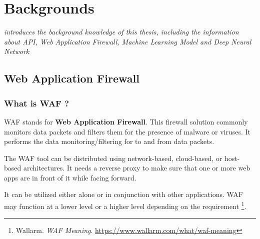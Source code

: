 \chapter{Backgrounds}
\label{chap:backgrounds}
	\textit{introduces the background knowledge of this thesis, including the information about API, Web Application Firewall, Machine Learning Model and Deep Neural Network}
\minitoc

\section{Web Application Firewall} 
\label{sec:waf}
	
\subsection{What is WAF ?}
\label{subsec:waf_def}
WAF stands for \textbf{Web Application Firewall}. This firewall solution commonly monitors data packets and filters them for the presence of malware or viruses. It performs the data monitoring/filtering for to and from data packets.  

The WAF tool can be distributed using network-based, cloud-based, or host-based architectures. It needs a reverse proxy to make sure that one or more web apps are in front of it while facing forward. 

It can be utilized either alone or in conjunction with other applications. WAF may function at a lower level or a higher level depending on the requirement \footnote{Wallarm. \textit{WAF Meaning}. \url{https://www.wallarm.com/what/waf-meaning}}.


